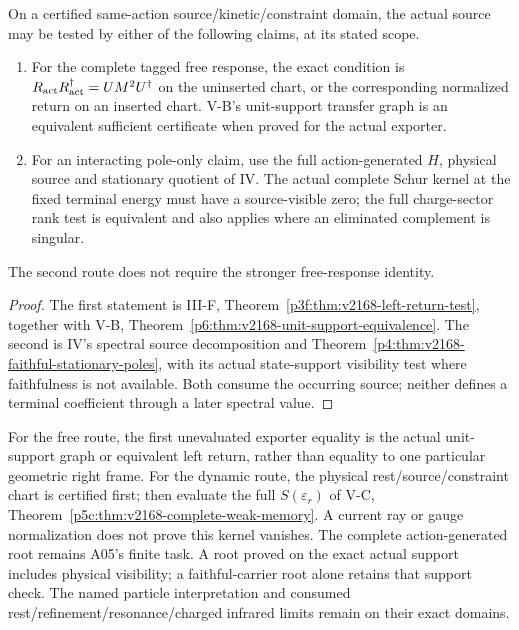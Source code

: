 \documentclass[12pt,a4paper]{article}
\begin{document}
\begin{corollary}
\label{p5:cor:v2168-charged-source-application-routes}
On a certified same-action source/kinetic/constraint domain, the actual
source may be tested by either of the following claims, at its stated scope.
\begin{enumerate}
\item For the complete tagged free response, the exact condition is
$R_{\rm act}R_{\rm act}^\dagger=UM^2U^\dagger$ on the uninserted chart,
or the corresponding normalized return on an inserted chart. V-B's
unit-support transfer graph is an equivalent sufficient certificate when
proved for the actual exporter.
\item For an interacting pole-only claim, use the full action-generated
$H$, physical source and stationary quotient of IV. The actual complete
Schur kernel at the fixed terminal energy must have a source-visible zero;
the full charge-sector rank test is equivalent and also applies where an
eliminated complement is singular.
\end{enumerate}
The second route does not require the stronger free-response identity.
\end{corollary}
\begin{proof}
The first statement is III-F,
Theorem~\ref{p3f:thm:v2168-left-return-test}, together with V-B,
Theorem~\ref{p6:thm:v2168-unit-support-equivalence}. The second is IV's
spectral source decomposition and
Theorem~\ref{p4:thm:v2168-faithful-stationary-poles}, with its actual
state-support visibility test where faithfulness is not available.
Both consume the occurring source; neither defines a terminal coefficient
through a later spectral value.
\end{proof}

For the free route, the first unevaluated exporter equality is the actual
unit-support graph or equivalent left return, rather than equality to one
particular geometric right frame. For the dynamic route, the physical
rest/source/constraint chart is certified first; then evaluate the full
$S(\varepsilon_r)$ of V-C,
Theorem~\ref{p5c:thm:v2168-complete-weak-memory}. A current ray or gauge
normalization does not prove this kernel vanishes. The complete action-generated root remains A05's finite task. A root
proved on the exact actual support includes physical visibility; a
faithful-carrier root alone retains that support check. The named particle
interpretation and consumed rest/refinement/resonance/charged infrared
limits remain on their exact domains.
\end{document}
